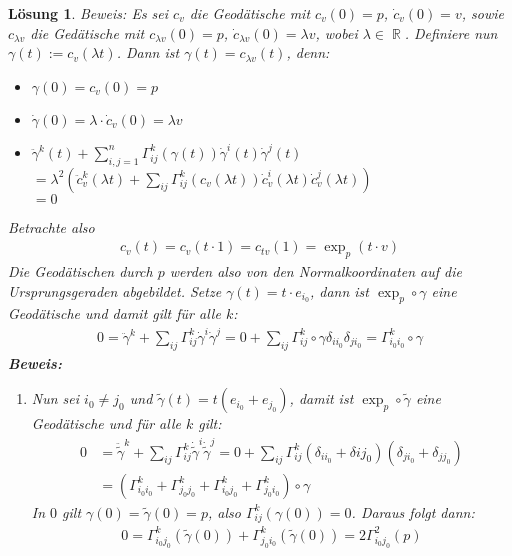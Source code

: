 \documentclass[paper=A4, twoside, chapterprefix=true, bibliography=totoc, headsepline]{scrbook}
\DeclareMathOperator{\R}{\mathbb{R}}
\theoremstyle{plain}
\theoremstyle{nonumberplain}
\theoremstyle{empty}
\theoremstyle{break}
\newtheorem{Loes}{L\"osung}
\begin{document}
\begin{Loes}
\emph{Beweis:} Es sei $c_v$ die Geod\"atische mit $c_v(0) = p$, $\dot c_v(0) = v$, sowie $c_{\lambda v}$ die Ged\"atische mit $c_{\lambda v}(0) = p$, $\dot c_{\lambda v}(0) = \lambda v$, wobei $\lambda \in \R$.
Definiere nun $\gamma(t) := c_v(\lambda t)$. Dann ist $\gamma(t) = c_{\lambda v}(t)$, denn:\begin{itemize}
\item
	$\gamma(0) = c_v(0) = p$
\item
	$\dot \gamma(0) = \lambda \cdot \dot c_v(0) = \lambda v$
\item
	$\ddot \gamma^k(t) + \sum_{i,j=1}^n \Gamma_{ij}^k(\gamma(t)) \dot\gamma^{i}(t) \dot\gamma^{j}(t)$\\
	$= \lambda^2 \left( \ddot c_v^k(\lambda t) + \sum_{ij} \Gamma_{ij}^k(c_v(\lambda t)) \dot c_v^{i}(\lambda t) \dot c_v^{j}(\lambda t) \right)$\\
	$=0$
\end{itemize}
Betrachte also
\begin{align*}
	c_v(t) = c_v(t \cdot 1) = c_{tv}(1) = \exp_p(t \cdot v)
\end{align*}
Die Geod\"atischen durch $p$ werden also von den Normalkoordinaten auf die Ursprungsgeraden abgebildet. Setze $\gamma(t) = t \cdot e_{i_0}$, dann ist $\exp_p \circ \gamma$ eine Geod\"atische und damit gilt f\"ur alle $k$:
\begin{align*}
	0 = \ddot\gamma^k + \sum_{ij} \Gamma_{ij}^k \dot\gamma^{i} \dot\gamma^{j} = 0 + \sum_{ij} \Gamma_{ij}^k \circ \gamma \delta_{ii_0} \delta_{ji_0} = \Gamma_{i_0i_0}^k \circ \gamma
\end{align*}
\textbf{Beweis:}\begin{enumerate}[label=(\roman*),leftmargin=*,widest=iii]
\item[(iii)]
	Nun sei $i_0 \ne j_0$ und $\tilde\gamma(t) = t(e_{i_0} + e_{j_0})$, damit ist $\exp_p \circ \tilde\gamma$ eine Geod\"atische und f\"ur alle $k$ gilt:
	\begin{align*}
		0 &= \ddot{\tilde\gamma}^k + \sum_{ij} \Gamma_{ij}^k \dot{\tilde\gamma}^{i} \dot{\tilde\gamma}^{j} = 0 + \sum_{ij} \Gamma_{ij}^k (\delta_{ii_0} + \delta{ij_0}) (\delta_{ji_0} + \delta_{jj_0})\\
		&= \left( \Gamma_{i_0i_0}^k + \Gamma_{j_0j_0}^k + \Gamma_{i_0j_0}^k +\Gamma_{j_0i_0}^k \right) \circ \gamma
	\end{align*}
	In $0$ gilt $\gamma(0) = \tilde\gamma(0) = p$, also $\Gamma_{ij}^k(\gamma(0)) = 0$. Daraus folgt dann:
	\begin{align*}
		0 = \Gamma_{i_0j_0}^k (\tilde\gamma(0)) + \Gamma_{j_0i_0}^k (\tilde\gamma(0)) = 2 \Gamma_{i_0j_0}^2(p)

\end{align*}
\end{enumerate}
\end{Loes}
\end{document}
